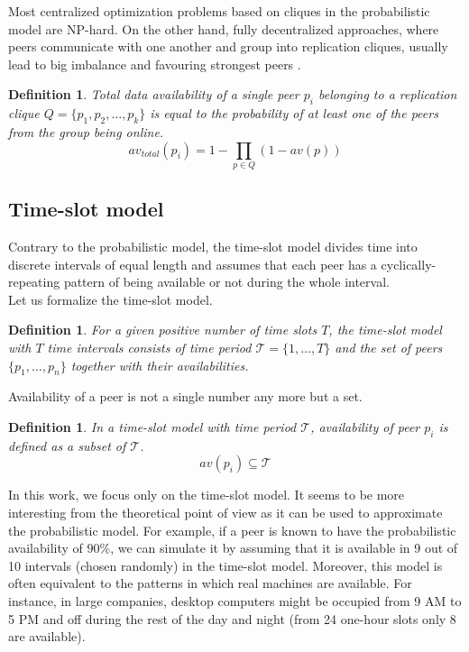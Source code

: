 \documentclass{pracamgren}
\newcounter{collective_ctr} \numberwithin{collective_ctr}{chapter}
\newtheorem{definition}[collective_ctr]{Definition}
\begin{document}
Most centralized optimization problems based on cliques in the probabilistic model are NP-hard. On the other hand, fully decentralized approaches, where peers communicate with one another and group into replication cliques, usually lead to big imbalance and favouring strongest peers \cite{krz}.\\

\begin{definition}
Total data availability of a single peer $p_i$ belonging to a replication clique $Q =\{p_{1}, p_{2}, \ldots, p_{k}\}$ is equal to the probability of at least one of the peers from the group being online.
$$av_{total}(p_i) = 1 - \prod_{p \in Q} (1 - av(p))$$
\end{definition}

\subsection{Time-slot model}

Contrary to the probabilistic model, the time-slot model divides time into discrete intervals of equal length and assumes that each peer has a cyclically-repeating pattern of being available or not during the whole interval.\\

Let us formalize the time-slot model.
\begin{definition}
For a given positive number of time slots $T$, the time-slot model with $T$ time intervals consists of time period $\mathcal{T} = \{1,\ldots,T\}$ and the set of peers $\{p_1,\ldots,p_n\}$ together with their availabilities.\\
\end{definition}

Availability of a peer is not a single number any more but a set.\\

\begin{definition}
In a time-slot model with time period $\mathcal{T}$, availability of peer $p_i$ is defined as a subset of $\mathcal{T}$.
$$av(p_i) \subseteq\mathcal{T}$$
\end{definition}

In this work, we focus only on the time-slot model. It seems to be more interesting from the theoretical point of view as it can be used to approximate the probabilistic model. For example, if a peer is known to have the probabilistic availability of $90\%$, we can simulate it by assuming that it is available in 9 out of 10 intervals (chosen randomly) in the time-slot model. Moreover, this model is often equivalent to the patterns in which real machines are available. For instance, in large companies, desktop computers might be occupied from 9 AM to 5 PM and off during the rest of the day and night (from 24 one-hour slots only 8 are available).\\
\end{document}
